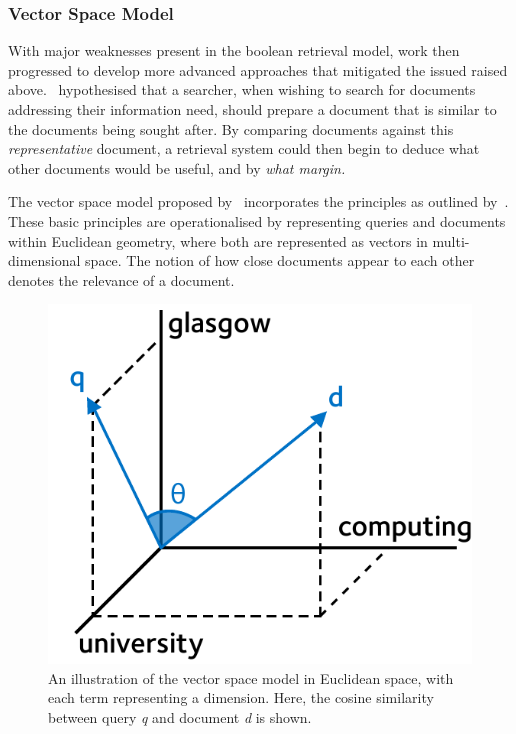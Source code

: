 \subsubsection{Vector Space Model}
With major weaknesses present in the boolean retrieval model, work then progressed to develop more advanced approaches that mitigated the issued raised above.~\cite{luhn1957ranking_query} hypothesised that a searcher, when wishing to search for documents addressing their information need, should prepare a document that is similar to the documents being sought after. By comparing documents against this \emph{representative} document, a retrieval system could then begin to deduce what other documents would be useful, and by \emph{what margin.}

The vector space model proposed by~\cite{salton1975vsm} incorporates the principles as outlined by~\cite{luhn1957ranking_query}. These basic principles are operationalised by representing queries and documents within Euclidean geometry, where both are represented as vectors in multi-dimensional space. The notion of how close documents appear to each other denotes the relevance of a document.

\begin{figure}
    \begin{center}
    \vspace*{-10mm}
    \includegraphics[width=1\textwidth]{figures/ch2-vector.pdf}
    \end{center}
    \vspace*{-4mm}
    \caption[Vector space model (cosine similarity)]{An illustration of the vector space model in Euclidean space, with each term representing a dimension. Here, the cosine similarity between query \emph{q} and document \emph{d} is shown.}
    \label{fig:vector_space}
\end{figure}


